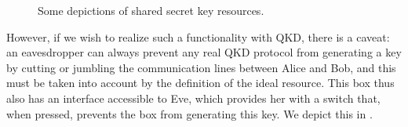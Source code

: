 \begin{figure}[tb]
{%







}

\caption[Secret key resources]{\label{fig:qkd.resource}Some depictions
  of shared secret key resources.}
\end{figure}

However, if we wish to realize such a functionality with QKD, there is
a caveat: an eavesdropper can always prevent any real QKD protocol
from generating a key by cutting or jumbling the communication lines
between Alice and Bob, and this must be taken into account by the
definition of the ideal resource. This box thus also has an interface
accessible to Eve, which provides her with a switch that, when
pressed, prevents the box from generating this key. We depict this in
.

